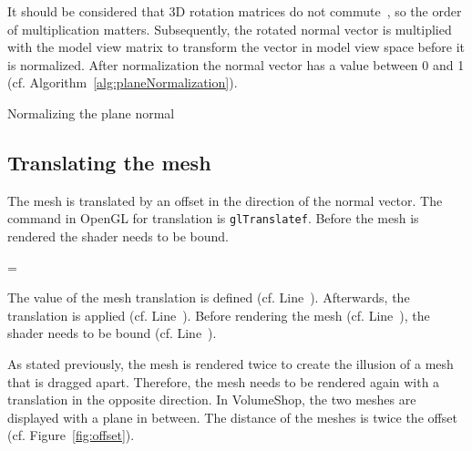 It should be considered that 3D rotation matrices do not commute~\cite{book:computerGraphicsHill}, so the order of multiplication matters. Subsequently, the rotated normal vector is multiplied with the model view matrix to transform the vector in model view space before it is normalized. After normalization the normal vector has a value between 0 and 1 (cf. Algorithm~\ref{alg:planeNormalization}).
\begin{algorithm}
\;
\BlankLine
\caption{Normalizing the plane normal}
\label{alg:planeNormalization}
\end{algorithm}

\subsection{Translating the mesh}
The mesh is translated by an offset in the direction of the normal vector. The command in OpenGL for translation is \texttt{glTranslatef}. Before the mesh is rendered the shader needs to be bound.
\LinesNumbered
\begin{algorithm}
  = \;\label{ln:translationValue}
\;\label{ln:mtranslation}
\;\label{ln:bindShader}
\;\label{ln:renderMesh}
\;\label{ln:releaseMesh}
\BlankLine
\caption{The value of the mesh translation is defined (cf. Line~\NlSty{\ref{ln:translationValue}}). Afterwards, the translation is applied (cf. Line~\NlSty{\ref{ln:mtranslation}}). Before rendering the mesh (cf. Line~\NlSty{\ref{ln:renderMesh}}), the shader needs to be bound (cf. Line~\NlSty{\ref{ln:bindShader}}).}
\label{alg:shaderBinding}
\end{algorithm}
\LinesNotNumbered

As stated previously, the mesh is rendered twice to create the illusion of a mesh that is dragged apart. Therefore, the mesh needs to be rendered again with a translation in the opposite direction. In VolumeShop, the two meshes are displayed with a plane in between. The distance of the meshes is twice the offset (cf. Figure~\ref{fig:offset}).

